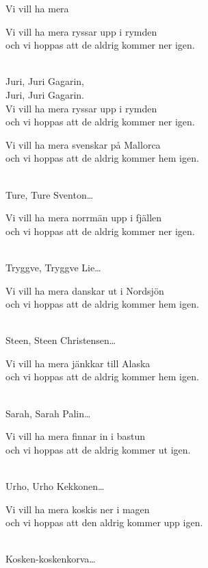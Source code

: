 \begin{song}{Vi vill ha mera}

    \showversenumber	
	\begin{repetition}
		Vi vill ha mera ryssar upp i rymden\\
		och vi hoppas att de aldrig kommer ner igen.
	\end{repetition}\\
	Juri, Juri Gagarin,\\
	Juri, Juri Gagarin.\\
	Vi vill ha mera ryssar upp i rymden\\
	och vi hoppas att de aldrig kommer ner igen.
	
    \showversenumber
	\begin{repetition}
		Vi vill ha mera svenskar på Mallorca\\
		och vi hoppas att de aldrig kommer hem igen.
	\end{repetition}\\
	Ture, Ture Sventon\ldots{}
	
    \showversenumber
	\begin{repetition}
		Vi vill ha mera norrmän upp i fjällen\\
		och vi hoppas att de aldrig kommer ner igen.
	\end{repetition}\\
	Tryggve, Tryggve Lie\ldots{}
	
    \showversenumber
	\begin{repetition}
		Vi vill ha mera danskar ut i Nordsjön\\
		och vi hoppas att de aldrig kommer hem igen.
	\end{repetition}\\
	Steen, Steen Christensen\ldots{}
	
    \showversenumber
	\begin{repetition}
		Vi vill ha mera jänkkar till Alaska\\
		och vi hoppas att de aldrig kommer hem igen.
	\end{repetition}\\
	Sarah, Sarah Palin\ldots{}
	
    \showversenumber
	\begin{repetition}
		Vi vill ha mera finnar in i bastun\\
		och vi hoppas att de aldrig kommer ut igen.
	\end{repetition}\\
	Urho, Urho Kekkonen\ldots{}
	
    \showversenumber
	\begin{repetition}
		Vi vill ha mera koskis ner i magen\\
		och vi hoppas att den aldrig kommer upp igen.
	\end{repetition}\\
	Kosken-koskenkorva\ldots{}
	
\end{song}
